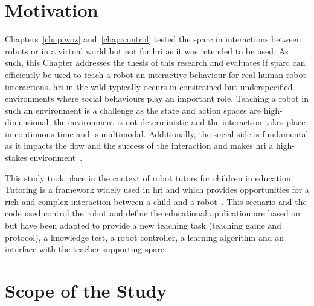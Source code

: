 \newpage

\section{Motivation}

Chapters~\ref{chap:woz} and~\ref{chap:control} tested the \gls{sparc} in interactions between robots or in a virtual world but not for \gls{hri} as it was intended to be used. As such, this Chapter addresses the thesis of this research and evaluates if \gls{sparc} can efficiently be used to teach a robot an interactive behaviour for real human-robot interactions. \gls{hri} in the wild typically occurs in constrained but underspecified environments where social behaviours play an important role. Teaching a robot in such an environment is a challenge as the state and action spaces are high-dimensional, the environment is not deterministic and the interaction takes place in continuous time and is multimodal. Additionally, the social side is fundamental as it impacts the flow and the success of the interaction and makes \gls{hri} a high-stakes environment~\citep{belpaeme2012multimodal}. %

This study took place in the context of robot tutors for children in education. Tutoring is a framework widely used in \gls{hri} and which provides opportunities for a rich and complex interaction between a child and a robot~\citep{leyzberg2012physical,kennedy2015robot}. This scenario and the code used control the robot and define the educational application are based on \cite{lemaignan2017free} but have been adapted to provide a new teaching task (teaching game and protocol), a knowledge test, a robot controller, a learning algorithm and an interface with the teacher supporting \gls{sparc}.


\section{Scope of the Study} \label{sec:tutoring_scope}

